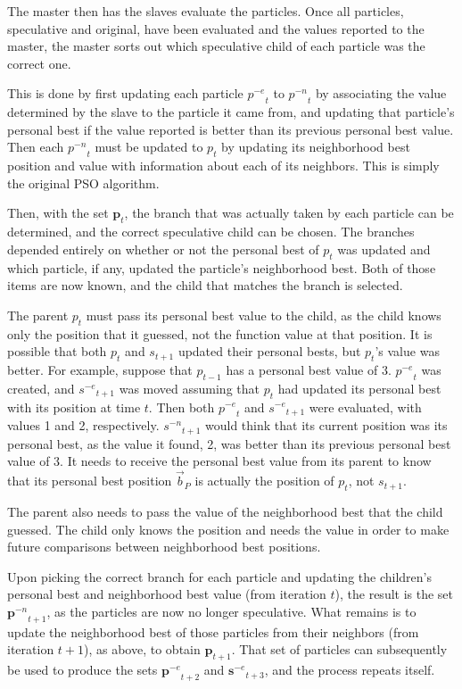 \documentclass[conference,letterpaper]{IEEEtran}
\providecommand{\pbest}{\ensuremath{\Vec{b}_P}}
\providecommand{\noeval}[1]{\ensuremath{#1^{-e}}}
\providecommand{\nonbest}[1]{\ensuremath{#1^{-n}}}
\providecommand{\p}{\ensuremath{p}}
\providecommand{\pset}{\ensuremath{\mathbf{p}}}
\providecommand{\s}{\ensuremath{s}}
\providecommand{\sset}{\ensuremath{\mathbf{s}}}
\begin{document}
The master then has the slaves evaluate the particles.  Once all particles,
speculative and original, have been evaluated and the values reported to the
master, the master sorts out which speculative child of each particle was the
correct one.

This is done by first updating each particle $\noeval{\p}_t$ to
$\nonbest{\p}_t$ by associating the value determined by the slave to the
particle it came from, and updating that particle's personal best if the value
reported is better than its previous personal best value.  Then each
$\nonbest{\p}_t$ must be updated to $\p_t$ by updating its neighborhood best
position and value with information about each of its neighbors.  This is
simply the original PSO algorithm.

Then, with the set $\pset_t$, the branch that was actually taken by each
particle can be determined, and the correct speculative child can be chosen.
The branches depended entirely on whether or not the personal best of $p_t$ was
updated and which particle, if any, updated the particle's neighborhood best.
Both of those items are now known, and the child that matches the branch is
selected.

The parent $\p_t$ must pass its personal best value to the child, as the child
knows only the position that it guessed, not the function value at that
position.  It is possible that both $\p_t$ and $\s_{t+1}$ updated their
personal bests, but $\p_t$'s value was better.  For example, suppose that
$\p_{t-1}$ has a personal best value of 3.  $\noeval{\p}_t$ was created, and
$\noeval{\s}_{t+1}$ was moved assuming that $\p_t$ had updated its personal
best with its position at time $t$.  Then both $\noeval{\p}_t$ and
$\noeval{\s}_{t+1}$ were evaluated, with values 1 and 2, respectively.
$\nonbest{\s}_{t+1}$ would think that its current position was its personal
best, as the value it found, 2, was better than its previous personal best
value of 3.  It needs to receive the personal best value from its parent to
know that its personal best position $\pbest$ is actually the position of
$\p_t$, not $\s_{t+1}$.

The parent also needs to pass the value of the neighborhood best that the child
guessed.  The child only knows the position and needs the value in order to
make future comparisons between neighborhood best positions.

Upon picking the correct branch for each particle and updating the children's
personal best and neighborhood best value (from iteration $t$), the result is
the set $\nonbest{\pset}_{t+1}$, as the particles are now no longer
speculative.  What remains is to update the neighborhood best of those
particles from their neighbors (from iteration $t+1$), as above, to obtain
$\pset_{t+1}$.  That set of particles can subsequently be used to produce the
sets $\noeval{\pset}_{t+2}$ and $\noeval{\sset}_{t+3}$, and the process repeats
itself.
\end{document}
